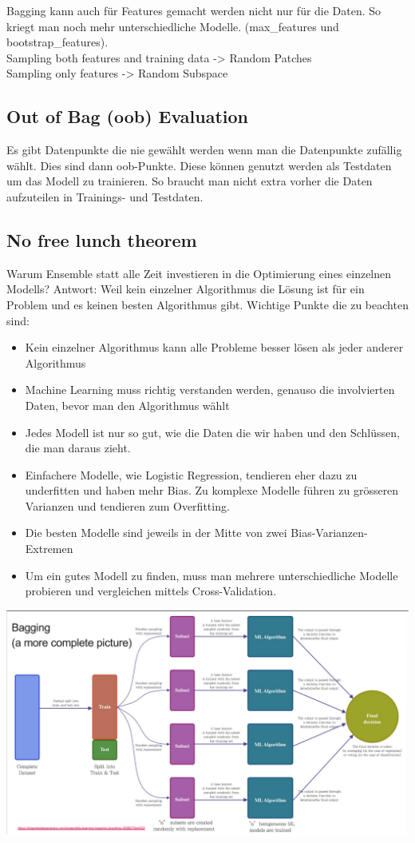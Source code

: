 Bagging kann auch für Features gemacht werden nicht nur für die Daten. So kriegt man noch mehr unterschiedliche Modelle. (max\_features und bootstrap\_features).\\
Sampling both features and training data -> Random Patches\\
Sampling only features -> Random Subspace\\
\subsection{Out of Bag (oob) Evaluation}
Es gibt Datenpunkte die nie gewählt werden wenn man die Datenpunkte zufällig wählt. Dies sind dann oob-Punkte. Diese können genutzt werden als Testdaten um das Modell zu trainieren. So braucht man nicht extra vorher die Daten aufzuteilen in Trainings- und Testdaten.
\subsection{No free lunch theorem}
Warum Ensemble statt alle Zeit investieren in die Optimierung eines einzelnen Modells? Antwort: Weil kein einzelner Algorithmus die Lösung ist für ein Problem und es keinen besten Algorithmus gibt. Wichtige Punkte die zu beachten sind:
\begin{itemize}
\item Kein einzelner Algorithmus kann alle Probleme besser lösen als jeder anderer Algorithmus
\item Machine Learning muss richtig verstanden werden, genauso die involvierten Daten, bevor man den Algorithmus wählt
\item Jedes Modell ist nur so gut, wie die Daten die wir haben und den Schlüssen, die man daraus zieht.
\item Einfachere Modelle, wie Logistic Regression, tendieren eher dazu zu underfitten und haben mehr Bias. Zu komplexe Modelle führen zu grösseren Varianzen und tendieren zum Overfitting.
\item Die besten Modelle sind jeweils in der Mitte von zwei Bias-Varianzen-Extremen
\item Um ein gutes Modell zu finden, muss man mehrere unterschiedliche Modelle probieren und vergleichen mittels Cross-Validation.
\end{itemize}
\includegraphics[width=1.1\linewidth]{img/bagging_overview.png}
